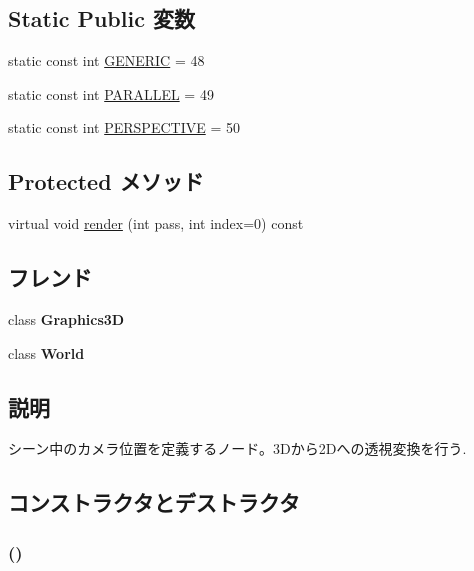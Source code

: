 \subsection*{Static Public 変数}
\begin{CompactItemize}
\item 
static const int \hyperlink{classm3g_1_1Camera_48a4e153c97a1f4890558a77dfe02ca4}{GENERIC} = 48
\item 
static const int \hyperlink{classm3g_1_1Camera_d9630da0e9505afbb107c86229aa2f08}{PARALLEL} = 49
\item 
static const int \hyperlink{classm3g_1_1Camera_e62e72bde93e7d7ceb482e7a8c40dcf5}{PERSPECTIVE} = 50
\end{CompactItemize}
\subsection*{Protected メソッド}
\begin{CompactItemize}
\item 
virtual void \hyperlink{classm3g_1_1Camera_1efcb1973989d9963d5bd6d03065d389}{render} (int pass, int index=0) const 
\end{CompactItemize}
\subsection*{フレンド}
\begin{CompactItemize}
\item 
\hypertarget{classm3g_1_1Camera_8174d4c629550c1ee279571250236ef4}{
class \textbf{Graphics3D}}
\label{classm3g_1_1Camera_8174d4c629550c1ee279571250236ef4}

\item 
\hypertarget{classm3g_1_1Camera_7b4bcdf992c21ae83363f25df05b1d25}{
class \textbf{World}}
\label{classm3g_1_1Camera_7b4bcdf992c21ae83363f25df05b1d25}

\end{CompactItemize}


\subsection{説明}
シーン中のカメラ位置を定義するノード。3Dから2Dへの透視変換を行う. 

\subsection{コンストラクタとデストラクタ}
\hypertarget{classm3g_1_1Camera_a3f3efcb2fcc75de885df29041103cd2}{
\subsubsection[{Camera}]{ ()}}
\label{classm3g_1_1Camera_a3f3efcb2fcc75de885df29041103cd2}


